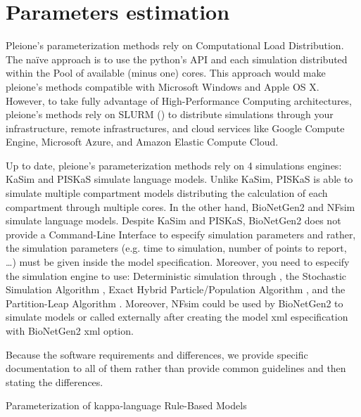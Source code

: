 \documentclass[letterpaper,10pt,english]{sphinxmanual}
\begin{document}
\chapter{Parameters estimation}
\label{\detokenize{ParameterEstimation:parameters-estimation}}\label{\detokenize{ParameterEstimation::doc}}
Pleione’s parameterization methods rely on Computational Load Distribution. The
naïve approach is to use the python’s  API and each simulation
distributed within the Pool of available (minus one) cores. This approach would
make pleione’s methods compatible with Microsoft Windows and Apple OS X.
However, to take fully advantage of High-Performance Computing architectures,
pleione’s methods rely on SLURM \textendash{}\textendash{} () to distribute simulations through your infrastructure,
remote infrastructures, and cloud services like Google Compute Engine, Microsoft
Azure, and Amazon Elastic Compute Cloud.

Up to date, pleione’s parameterization methods rely on 4 simulations engines:
KaSim and PISKaS simulate  language models. Unlike KaSim, PISKaS is able
to simulate multiple compartment models distributing the calculation of each
compartment through multiple cores. In the other hand, BioNetGen2 and NFsim
simulate  language models. Despite KaSim and PISKaS, BioNetGen2 does
not provide a Command-Line Interface to especify simulation parameters and
rather, the simulation parameters (e.g. time to simulation, number of points to
report, …) must be given inside the model specification. Moreover, you need to
especify the simulation engine to use: Deterministic simulation through ,
the Stochastic Simulation Algorithm , Exact Hybrid Particle/Population
Algorithm , and the Partition-Leap Algorithm . Moreover, NFsim could
be used by BioNetGen2 to simulate models or called externally after creating the
model xml especification with BioNetGen2 \textendash{}xml option.

Because the software requirements and differences, we provide specific
documentation to all of them rather than provide common guidelines and then
stating the differences.

Parameterization of kappa-language Rule-Based Models
\end{document}

